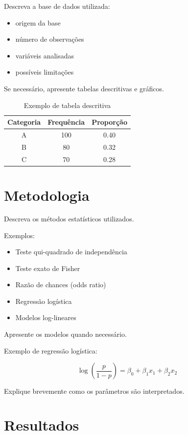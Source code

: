 \documentclass[12pt]{article}
\begin{document}
Descreva a base de dados utilizada:

\begin{itemize}
\item origem da base
\item número de observações
\item variáveis analisadas
\item possíveis limitações
\end{itemize}

Se necessário, apresente tabelas descritivas e gráficos.

\begin{table}[h]
\centering
\begin{tabular}{ccc}
\toprule
Categoria & Frequência & Proporção \\
\midrule
A & 100 & 0.40 \\
B & 80 & 0.32 \\
C & 70 & 0.28 \\
\bottomrule
\end{tabular}
\caption{Exemplo de tabela descritiva}
\end{table}

\section{Metodologia}

Descreva os métodos estatísticos utilizados.

Exemplos:

\begin{itemize}
\item Teste qui-quadrado de independência
\item Teste exato de Fisher
\item Razão de chances (odds ratio)
\item Regressão logística
\item Modelos log-lineares
\end{itemize}

Apresente os modelos quando necessário.

Exemplo de regressão logística:

\begin{equation}
\log\left(\frac{p}{1-p}\right) = \beta_0 + \beta_1 x_1 + \beta_2 x_2
\end{equation}

Explique brevemente como os parâmetros são interpretados.

\section{Resultados}
\end{document}
